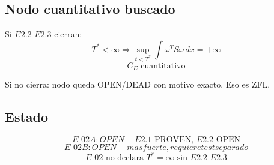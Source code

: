 \documentclass[11pt]{article}
\begin{document}
\subsection*{Nodo cuantitativo buscado}
Si $E2.2$-$E2.3$ cierran:
\[
\boxed{T^*<\infty\Rightarrow\sup_{t<T^*}\int\omega^T S\omega\,dx=+\infty}
\]
\[
\boxed{C_E\text{ cuantitativo}}
\]

Si no cierra: nodo queda OPEN/DEAD con motivo exacto. Eso es ZFL.

\subsection*{Estado}
\[
\boxed{E\text{-}02A: OPEN - E2.1\text{ PROVEN, }E2.2\text{ OPEN}}
\]
\[
\boxed{E\text{-}02B: OPEN - mas fuerte, requiere test separado}
\]
\[
\boxed{E\text{-}02\text{ no declara }T^*=\infty\text{ sin }E2.2\text{-}E2.3}
\]
\end{document}
